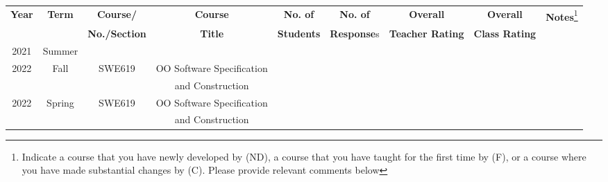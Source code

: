 \documentclass[11pt]{article}
\begin{document}
\begin{minipage}{\textwidth}
  \footnotesize
  \begin{tabular}{ccccccccc}
    \toprule
    \textbf{Year}&\textbf{Term}&\textbf{Course/}&\textbf{Course}&\textbf{No. of}&\textbf{No. of}&\textbf{Overall}&\textbf{Overall}&\textbf{Notes}\footnote{Indicate a course that you have newly developed by (ND), a course that you have taught for the first time by (F), or a course where you have made substantial changes by (C).  Please provide relevant comments below}\\
    &&\textbf{No./Section}&\textbf{Title}&\textbf{Students}&\textbf{Response}s& \textbf{Teacher Rating}& \textbf{Class Rating}&\\
    \midrule
    2021& Summer & & & & & & &\\
    \midrule
    2022& Fall & SWE619 & OO Software Specification & & & & &\\
    &&&and Construction &&&&\\
    \bottomrule
    2022& Spring & SWE619 & OO Software Specification & & & & &\\
    &&&and Construction &&&&\\
    \bottomrule
  \end{tabular}
\end{minipage}


% 
\end{document}
